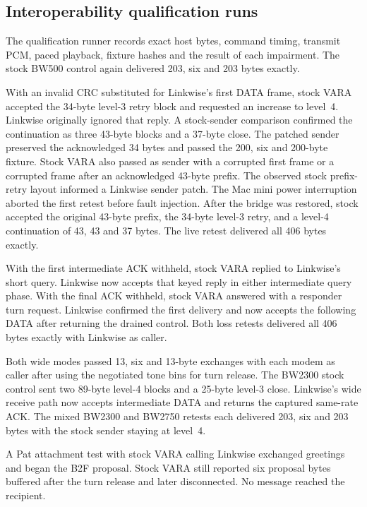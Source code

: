 \documentclass[11pt,a4paper]{article}
\begin{document}
\subsection{Interoperability qualification runs}

The qualification runner records exact host bytes, command timing,
transmit PCM, paced playback, fixture hashes and the result of
each impairment. The stock BW500 control again delivered
203, six and 203 bytes exactly.

With an invalid CRC substituted for Linkwise's first DATA frame,
stock VARA accepted the 34-byte level-3 retry block and requested
an increase to level~4. Linkwise originally ignored that reply.
A stock-sender comparison confirmed the continuation as three
43-byte blocks and a 37-byte close. The patched sender preserved
the acknowledged 34 bytes and passed the 200, six and 200-byte
fixture. Stock VARA also passed as sender with a corrupted first
frame or a corrupted frame after an acknowledged 43-byte prefix.
The observed stock prefix-retry layout informed a Linkwise sender
patch. The Mac mini power interruption aborted the first retest
before fault injection. After the bridge was restored, stock
accepted the original 43-byte prefix, the 34-byte level-3 retry,
and a level-4 continuation of 43, 43 and 37 bytes. The live
retest delivered all 406 bytes exactly.

With the first intermediate ACK withheld, stock VARA replied to
Linkwise's short query. Linkwise now accepts that keyed reply in
either intermediate query phase. With the final ACK withheld,
stock VARA answered with a responder turn request. Linkwise
confirmed the first delivery and now accepts the following DATA
after returning the drained control. Both loss retests delivered
all 406 bytes exactly with Linkwise as caller.

Both wide modes passed 13, six and 13-byte exchanges with each
modem as caller after using the negotiated tone bins for turn
release. The BW2300 stock control sent two 89-byte level-4 blocks
and a 25-byte level-3 close. Linkwise's wide receive path now
accepts intermediate DATA and returns the captured same-rate ACK.
The mixed BW2300 and BW2750 retests each delivered 203, six and
203 bytes with the stock sender staying at level~4.

A Pat attachment test with stock VARA calling Linkwise exchanged
greetings and began the B2F proposal. Stock VARA still reported
six proposal bytes buffered after the turn release and later
disconnected. No message reached the recipient.
\end{document}
